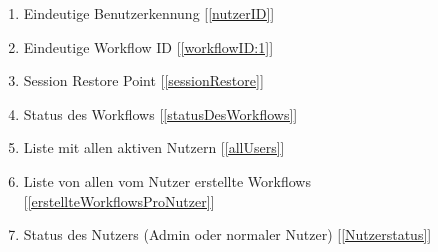         \begin{enumerate}[font={\bfseries}, label={TF\arabic*}0, wide=0pt, labelindent=1em, leftmargin=*, resume]
            \item Eindeutige Benutzerkennung [\ref{nutzerID}]
            \item Eindeutige Workflow ID [\ref{workflowID:1}]
            \item Session Restore Point [\ref{sessionRestore}]
            \item Status des Workflows [\ref{statusDesWorkflows}]
            \item Liste mit allen aktiven Nutzern [\ref{allUsers}]
            \item Liste von allen vom Nutzer erstellte Workflows [\ref{erstellteWorkflowsProNutzer}]
            \item Status des Nutzers (Admin oder normaler Nutzer) [\ref{Nutzerstatus}]
        \end{enumerate}
        

